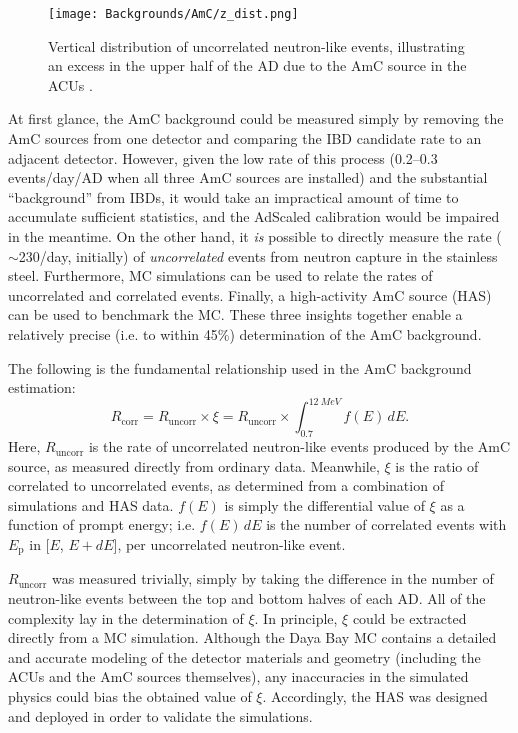 \documentclass[../thesis.tex]{subfiles}
\begin{document}
\begin{figure}[ht]
  \texttt{[image: Backgrounds/AmC/z\_dist.png]}
  \caption{Vertical distribution of uncorrelated neutron-like events, illustrating an excess in the upper half of the AD due to the AmC source in the ACUs \cite{Gu_2016}.}
  \label{fig:amc_z_dist}
\end{figure}

At first glance, the AmC background could be measured simply by removing the AmC sources from one detector and comparing the IBD candidate rate to an adjacent detector. However, given the low rate of this process (0.2--0.3 events/day/AD when all three AmC sources are installed) and the substantial ``background'' from IBDs, it would take an impractical amount of time to accumulate sufficient statistics, and the AdScaled calibration would be impaired in the meantime. On the other hand, it \emph{is} possible to directly measure the rate ($\sim$230/day, initially) of \emph{uncorrelated} events from neutron capture in the stainless steel. Furthermore, MC simulations can be used to relate the rates of uncorrelated and correlated events. Finally, a high-activity AmC source (HAS) can be used to benchmark the MC. These three insights together enable a relatively precise (i.e. to within 45\%) determination of the AmC background.

The following is the fundamental relationship used in the AmC background estimation:
\begin{equation}
  R_{\mathrm{corr}} = R_{\mathrm{uncorr}} \times \xi = R_{\mathrm{uncorr}} \times \int_{0.7}^{\SI{12}{MeV}} f(E)\,dE.
\end{equation}
Here, $R_{\mathrm{uncorr}}$ is the rate of uncorrelated neutron-like events produced by the AmC source, as measured directly from ordinary data. Meanwhile, $\xi$ is the ratio of correlated to uncorrelated events, as determined from a combination of simulations and HAS data. $f(E)$ is simply the differential value of $\xi$ as a function of prompt energy; i.e. $f(E)\,dE$ is the number of correlated events with $E_{\mathrm{p}}$ in [$E$, $E + dE$], per uncorrelated neutron-like event.

$R_{\mathrm{uncorr}}$ was measured trivially, simply by taking the difference in the number of neutron-like events between the top and bottom halves of each AD. All of the complexity lay in the determination of $\xi$. In principle, $\xi$ could be extracted directly from a MC simulation. Although the Daya Bay MC contains a detailed and accurate modeling of the detector materials and geometry (including the ACUs and the AmC sources themselves), any inaccuracies in the simulated physics could bias the obtained value of $\xi$. Accordingly, the HAS was designed and deployed in order to validate the simulations.
\end{document}
